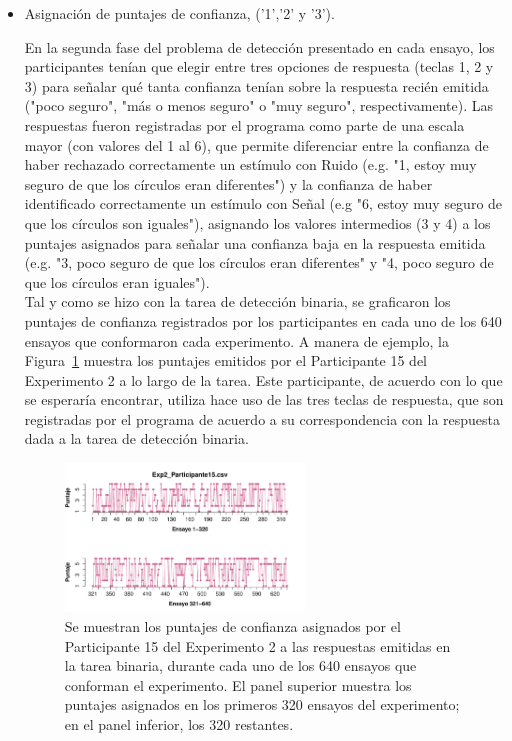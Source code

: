 \begin{itemize}

\item Asignación de puntajes de confianza, ('1','2' y '3').

En la segunda fase del problema de detección presentado en cada ensayo, los participantes tenían que elegir entre tres opciones de respuesta (teclas 1, 2 y 3) para señalar qué tanta confianza tenían sobre la respuesta recién emitida ("poco seguro", "más o menos seguro" o "muy seguro", respectivamente). Las respuestas fueron registradas por el programa como parte de una escala mayor (con valores del 1 al 6), que permite diferenciar entre la confianza de haber rechazado correctamente un estímulo con Ruido (e.g. "1, estoy muy seguro de que los círculos eran diferentes") y la confianza de haber identificado correctamente un estímulo con Señal (e.g "6, estoy muy seguro de que los círculos son iguales"), asignando los valores intermedios (3 y 4) a los puntajes asignados para señalar una confianza baja en la respuesta emitida (e.g. "3, poco seguro de que los círculos eran diferentes" y "4, poco seguro de que los círculos eran iguales").\\

Tal y como se hizo con la tarea de detección binaria, se graficaron los puntajes de confianza registrados por los participantes en cada uno de los 640 ensayos que conformaron cada experimento. A manera de ejemplo, la Figura~\ref{fig:Rating_E2_P4} muestra los puntajes emitidos por el Participante 15 del Experimento 2 a lo largo de la tarea. Este participante, de acuerdo con lo que se esperaría encontrar, utiliza hace uso de las tres teclas de respuesta, que son registradas por el programa de acuerdo a su correspondencia con la respuesta dada a la tarea de detección binaria.\\ 
 
\begin{figure}[th]
\centering
\includegraphics[width=0.60\textwidth]{Figures/Rating_Exp2_P15} 
\caption[Asignacion Puntaje de confianza: Ejemplo]{Se muestran los puntajes de confianza asignados por el Participante 15 del Experimento 2 a las respuestas emitidas en la tarea binaria, durante cada uno de los 640 ensayos que conforman el experimento. El panel superior muestra los puntajes asignados en los primeros 320 ensayos del experimento; en el panel inferior, los 320 restantes.}
\label{fig:Rating_E2_P4}
\end{figure}


\end{itemize}
